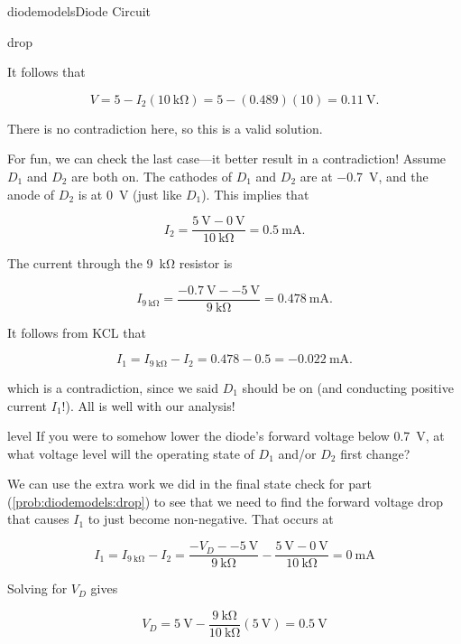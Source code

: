 \begin{mainquestion}{diodemodels}{Diode Circuit}
\begin{partquestion}{drop}
\begin{answer}
It follows that

\[
V
=
5
-
I_2\left(\qty{10}{\kilo\ohm}\right)
=
5
-
(0.489)\left(10\right)
=
\qty{0.11}{\volt}.
\]

There is no contradiction here, so this is a valid solution.

For fun, we can check the last case—it better result in a contradiction! Assume $D_1$ and $D_2$ are both on. The cathodes of $D_1$ and $D_2$ are at \qty{-0.7}{\volt}, and the anode of $D_2$ is at \qty{0}{\volt} (just like $D_1$). This implies that

\[
I_2
=
\frac{\qty{5}{\volt}-\qty{0}{\volt}}
{\qty{10}{\kilo\ohm}}
=
\qty{0.5}{\milli\ampere}.
\]

The current through the \qty{9}{\kilo\ohm} resistor is

\[
I_{\qty{9}{\kilo\ohm}}
=
\frac{\qty{-0.7}{\volt}-\qty{-5}{\volt}}
{\qty{9}{\kilo\ohm}}
=
\qty{0.478}{\milli\ampere}.
\]

It follows from KCL that

\[
I_1
=
I_{\qty{9}{\kilo\ohm}}-I_2
=
0.478-0.5
=
\qty{-0.022}{\milli\ampere}.
\]

which is a contradiction, since we said $D_1$ should be on (and conducting positive current $I_1$!). All is well with our analysis!
\end{answer}
\end{partquestion}

\begin{partquestion}{level}
{If you were to somehow lower the diode’s forward voltage below \qty{0.7}{\volt}, at what voltage level will the operating state of $D_1$ and/or $D_2$ first change?}

\begin{answer}
We can use the extra work we did in the final state check for part (\cref{prob:diodemodels:drop}) to see that we need to find the forward voltage drop that causes $I_1$ to just become non-negative. That occurs at

\[
I_1
=
I_{\qty{9}{\kilo\ohm}}
-
I_2
=
\frac{-V_D-\qty{-5}{\volt}}{\qty{9}{\kilo\ohm}}
-
\frac{\qty{5}{\volt}-\qty{0}{\volt}}{\qty{10}{\kilo\ohm}}
=
\qty{0}{\milli\ampere}
\]

Solving for $V_D$ gives

\[
V_D
=
\qty{5}{\volt}
-
\frac{\qty{9}{\kilo\ohm}}{\qty{10}{\kilo\ohm}}
\left(\qty{5}{\volt}\right)
=
\qty{0.5}{\volt}
\]
\end{answer}
\end{partquestion}


\end{mainquestion}
